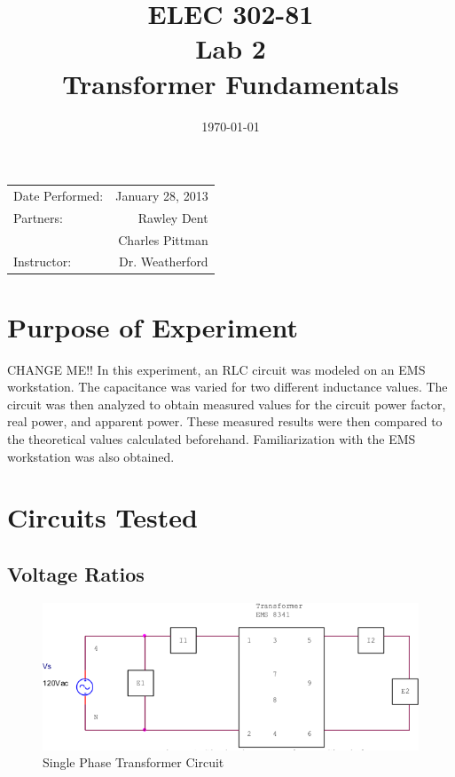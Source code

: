 \documentclass{article}
\title{ELEC 302-81\\ Lab 2\\ Transformer Fundamentals} %
\date{\today} %
\begin{document}
\maketitle

\begin{center}
  \begin{tabular}{lr}
    Date Performed: & January 28, 2013 \\
    Partners: & Rawley Dent \\
              & Charles Pittman \\
    Instructor: & Dr. Weatherford
  \end{tabular}
\end{center}

\pagebreak


\section{Purpose of Experiment}
CHANGE ME!! In this experiment, an RLC circuit was modeled on an EMS
workstation.  The capacitance was varied for two different inductance values.
The circuit was then analyzed to obtain measured values for the circuit power
factor, real power, and apparent power. These measured results were then
compared to the theoretical values calculated beforehand. Familiarization with
the EMS workstation was also obtained.

\section{Circuits Tested}
\subsection{Voltage Ratios}
\begin{figure}[H]
  \centering
  \includegraphics[width=.8\textwidth]{circuit_01}
  \caption{Single Phase Transformer Circuit}
  \label{fig:circuit_01}
\end{figure}
\end{document}
